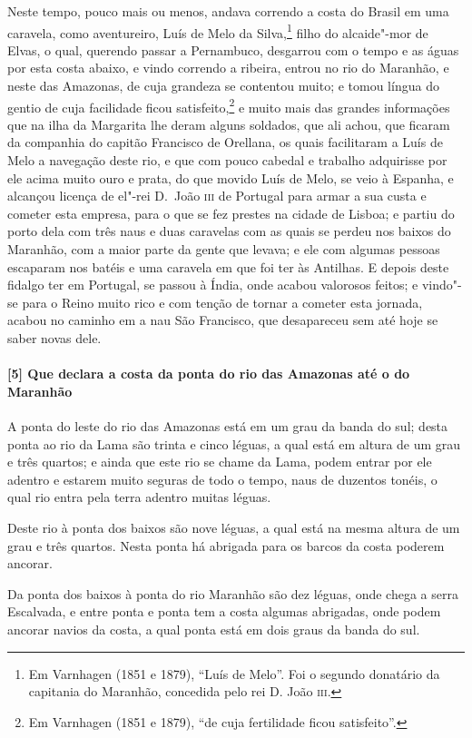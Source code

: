 Neste tempo, pouco mais ou menos, andava correndo a costa do Brasil em uma caravela, como
aventureiro, Luís de Melo da Silva,\footnote{ Em Varnhagen (1851 e 1879), ``Luís de Melo''.
Foi o segundo donatário da capitania do Maranhão, concedida pelo rei D. João
\textsc{iii}.} filho do alcaide"-mor de Elvas, o qual, querendo passar a Pernambuco,
desgarrou com o tempo e as águas por esta costa abaixo, e vindo correndo a ribeira, entrou
no rio do Maranhão, e neste das Amazonas, de cuja grandeza se contentou muito; e tomou
língua do gentio de cuja facilidade ficou satisfeito,\footnote{ Em Varnhagen (1851 e
1879), ``de cuja fertilidade ficou satisfeito''.} e muito mais das grandes informações que
na ilha da Margarita lhe deram alguns soldados, que ali achou, que ficaram da companhia do
capitão Francisco de Orellana, os quais facilitaram a Luís de Melo a navegação deste rio,
e que com pouco cabedal e trabalho adquirisse por ele acima muito ouro e prata, do que
movido Luís de Melo, se veio à Espanha, e alcançou licença de el"-rei D.~João \textsc{iii}
de Portugal para armar a sua custa e cometer esta empresa, para o que se fez prestes na
cidade de Lisboa; e partiu do porto dela com três naus e duas caravelas com as quais se
perdeu nos baixos do Maranhão, com a maior parte da gente que levava; e ele com algumas
pessoas escaparam nos batéis e uma caravela em que foi ter às Antilhas. E depois deste
fidalgo ter em Portugal, se passou à Índia, onde acabou valorosos feitos; e vindo"-se para
o Reino muito rico e com tenção de tornar a cometer esta jornada, acabou no caminho em a
nau São Francisco, que desapareceu sem até hoje se saber novas dele.

\paragraph{[5] Que declara a costa da ponta do rio das Amazonas até o do Maranhão} \quad
A ponta do leste do rio das Amazonas está em um grau da banda do sul; desta ponta ao rio
da Lama são trinta e cinco léguas, a qual está em altura de um grau e três quartos; e
ainda que este rio se chame da Lama, podem entrar por ele adentro e estarem muito seguras
de todo o tempo, naus de duzentos tonéis, o qual rio entra pela terra adentro muitas
léguas.

Deste rio à ponta dos baixos são nove léguas, a qual está na mesma altura de um grau e
três quartos. Nesta ponta há abrigada para os barcos da costa poderem ancorar.

Da ponta dos baixos à ponta do rio Maranhão são dez léguas, onde chega a serra Escalvada,
e entre ponta e ponta tem a costa algumas abrigadas, onde podem ancorar navios da costa, a
qual ponta está em dois graus da banda do sul.

